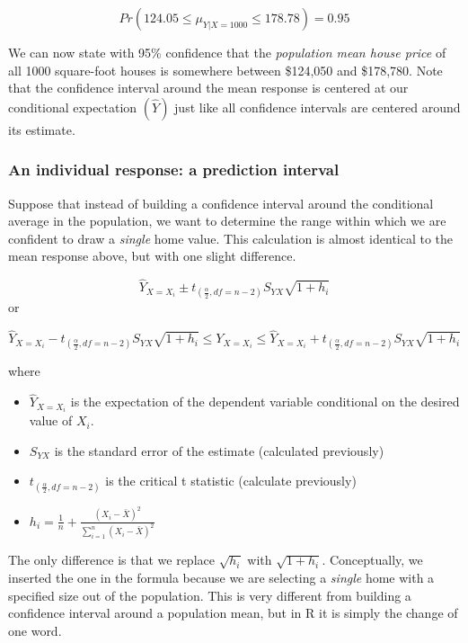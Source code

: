 \documentclass[
]{book}
\begin{document}
\[Pr(124.05\leq\mu_{Y|X=1000}\leq178.78)=0.95\]

We can now state with 95\% confidence that the \emph{population mean house price} of all 1000 square-foot houses is somewhere between \$124,050 and \$178,780. Note that the confidence interval around the mean response is centered at our conditional expectation \((\hat{Y})\) just like all confidence intervals are centered around its estimate.

\hypertarget{an-individual-response-a-prediction-interval}{%
\subsubsection*{An individual response: a prediction interval}\label{an-individual-response-a-prediction-interval}}

Suppose that instead of building a confidence interval around the conditional average in the population, we want to determine the range within which we are confident to draw a \emph{single} home value. This calculation is almost identical to the mean response above, but with one slight difference.

\[ \hat{Y}_{X=X_i} \pm t_{(\frac{\alpha}{2},df=n-2)}S_{YX} \sqrt{1+h_i}\]
or

\[ \hat{Y}_{X=X_i} - t_{(\frac{\alpha}{2},df=n-2)}S_{YX} \sqrt{1+h_i} \leq Y_{X=X_i} \leq \hat{Y}_{X=X_i} + t_{(\frac{\alpha}{2},df=n-2)}S_{YX} \sqrt{1+h_i}\]

where

\begin{itemize}
\item
  \(\hat{Y}_{X=X_i}\) is the expectation of the dependent variable conditional on the desired value of \(X_i\).
\item
  \(S_{YX}\) is the standard error of the estimate (calculated previously)
\item
  \(t_{(\frac{\alpha}{2},df=n-2)}\) is the critical t statistic (calculate previously)
\item
  \(h_i = \frac{1}{n}+\frac{(X_i - \bar{X})^2}{\sum_{i=1}^n(X_i - \bar{X})^2}\)
\end{itemize}

The only difference is that we replace \(\sqrt{h_i}\) with \(\sqrt{1+h_i}\). Conceptually, we inserted the one in the formula because we are selecting a \emph{single} home with a specified size out of the population. This is very different from building a confidence interval around a population mean, but in R it is simply the change of one word.
\end{document}
